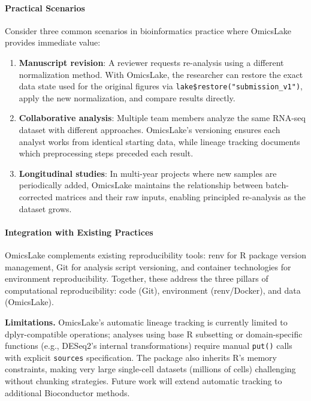 \documentclass[11pt,a4paper]{article}
\begin{document}
\paragraph{Practical Scenarios}
Consider three common scenarios in bioinformatics practice where OmicsLake provides immediate value:

\begin{enumerate}
    \item \textbf{Manuscript revision}: A reviewer requests re-analysis using a different normalization method. With OmicsLake, the researcher can restore the exact data state used for the original figures via \texttt{lake\$restore("submission\_v1")}, apply the new normalization, and compare results directly.

    \item \textbf{Collaborative analysis}: Multiple team members analyze the same RNA-seq dataset with different approaches. OmicsLake's versioning ensures each analyst works from identical starting data, while lineage tracking documents which preprocessing steps preceded each result.

    \item \textbf{Longitudinal studies}: In multi-year projects where new samples are periodically added, OmicsLake maintains the relationship between batch-corrected matrices and their raw inputs, enabling principled re-analysis as the dataset grows.
\end{enumerate}

\paragraph{Integration with Existing Practices}
OmicsLake complements existing reproducibility tools: renv for R package version management, Git for analysis script versioning, and container technologies for environment reproducibility. Together, these address the three pillars of computational reproducibility: code (Git), environment (renv/Docker), and data (OmicsLake).

\textbf{Limitations.} OmicsLake's automatic lineage tracking is currently limited to dplyr-compatible operations; analyses using base R subsetting or domain-specific functions (e.g., DESeq2's internal transformations) require manual \texttt{put()} calls with explicit \texttt{sources} specification. The package also inherits R's memory constraints, making very large single-cell datasets (millions of cells) challenging without chunking strategies. Future work will extend automatic tracking to additional Bioconductor methods.
\end{document}
